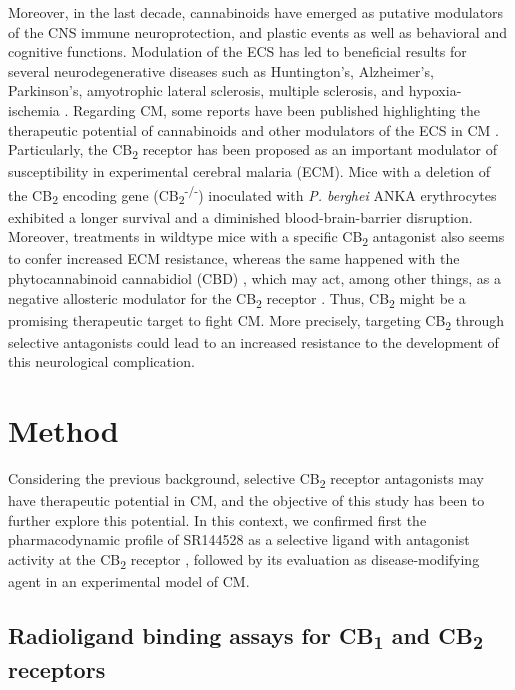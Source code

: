 \documentclass[empirical, authordate]{jote-new-article}
\begin{document}
Moreover, in the last decade, cannabinoids have emerged as putative modulators of the CNS immune neuroprotection, and plastic events as well as behavioral and cognitive functions. Modulation of the ECS has led to beneficial results for several neurodegenerative diseases such as Huntington's, Alzheimer's, Parkinson's, amyotrophic lateral sclerosis, multiple sclerosis, and hypoxia-ischemia \parencite{Fernández-Ruiz2015, Pazos2012}. Regarding CM, some reports have been published highlighting the therapeutic potential of cannabinoids and other modulators of the ECS in CM \parencite{Alferink2016, Campos2015}. Particularly, the CB\textsubscript{2} receptor has been proposed as an important modulator of susceptibility in experimental cerebral malaria (ECM). Mice with a deletion of the CB\textsubscript{2} encoding gene (CB\textsubscript{2}\textsuperscript{-/-}) inoculated with \emph{P. berghei }ANKA erythrocytes exhibited a longer survival and a diminished blood-brain-barrier disruption. Moreover, treatments in wildtype mice with a specific CB\textsubscript{2 }antagonist also seems to confer increased ECM resistance, whereas the same happened with the phytocannabinoid cannabidiol (CBD) \parencite{Campos2015}, which may act, among other things, as a negative allosteric modulator for the CB\textsubscript{2} receptor \parencite{Martínez-Pinilla2017}. Thus, CB\textsubscript{2} might be a promising therapeutic target to fight CM. More precisely, targeting CB\textsubscript{2} through selective antagonists could lead to an increased resistance to the development of this neurological complication.

\section{Method}

Considering the previous background, selective CB\textsubscript{2 }receptor antagonists may have therapeutic potential in CM, and the objective of this study has been to further explore this potential. In this context, we confirmed first the pharmacodynamic profile of SR144528 as a selective ligand with antagonist activity at the CB\textsubscript{2} receptor \parencite{Portier1999, Rinaldi-Carmona1998}, followed by its evaluation as disease-modifying agent in an experimental model of CM.

\subsection{Radioligand binding assays for CB\textsubscript{1} and CB\textsubscript{2} receptors}
\end{document}
